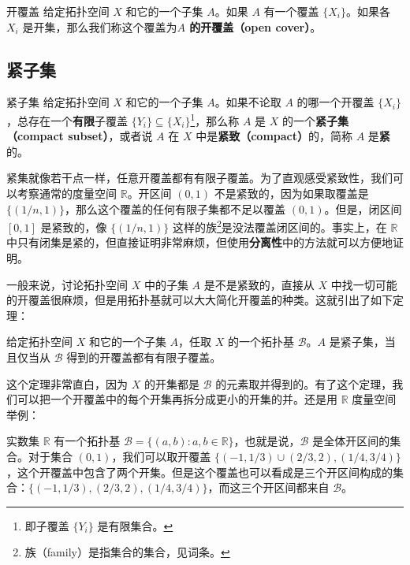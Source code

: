 \begin{definition}{开覆盖}
给定拓扑空间 $X$ 和它的一个子集 $A$。如果 $A$ 有一个覆盖 $\{X_i\}$。如果各 $X_i$ 是开集，那么我们称这个覆盖为\textbf{$A$ 的开覆盖（open cover）}。
\end{definition}

\subsection{紧子集}


\begin{definition}{紧子集}\label{Topo2_def1}
给定拓扑空间 $X$ 和它的一个子集 $A$。如果不论取 $A$ 的哪一个开覆盖 $\{X_i\}$，总存在一个\textbf{有限}子覆盖 $\{Y_i\}\subseteq \{X_i\}$\footnote{即子覆盖 $\{Y_i\}$ 是有限集合。}，那么称 $A$ 是 $X$ 的一个\textbf{紧子集（compact subset）}，或者说 $A$ 在 $X$ 中是\textbf{紧致（compact）}的，简称 $A$ 是\textbf{紧}的。
\end{definition}

紧集就像若干点一样，任意开覆盖都有有限子覆盖。为了直观感受紧致性，我们可以考察通常的度量空间 $\mathbb{R}$。开区间 $(0,1)$ 不是紧致的，因为如果取覆盖是 $\{(1/n, 1)\}$，那么这个覆盖的任何有限子集都不足以覆盖 $(0, 1)$。但是，闭区间 $[0,1]$ 是紧致的，像 $\{(1/n, 1)\}$ 这样的族\footnote{族（family）是指集合的集合，见词条。}是没法覆盖闭区间的。事实上，在 $\mathbb{R}$ 中只有闭集是紧的，但直接证明非常麻烦，但使用\textbf{分离性}中的方法就可以方便地证明。

一般来说，讨论拓扑空间 $X$ 中的子集 $A$ 是不是紧致的，直接从 $X$ 中找一切可能的开覆盖很麻烦，但是用拓扑基就可以大大简化开覆盖的种类。这就引出了如下定理：

\begin{theorem}{}\label{Topo2_the1}
给定拓扑空间 $X$ 和它的一个子集 $A$，任取 $X$ 的一个拓扑基 $\mathcal{B}$。$A$ 是紧子集，当且仅当从 $\mathcal{B}$ 得到的开覆盖都有有限子覆盖。
\end{theorem}

这个定理非常直白，因为 $X$ 的开集都是 $\mathcal{B}$ 的元素取并得到的。有了这个定理，我们可以把一个开覆盖中的每个开集再拆分成更小的开集的并。还是用 $\mathbb{R}$ 度量空间举例：

\begin{example}{}\label{Topo2_ex1}
实数集 $\mathbb{R}$ 有一个拓扑基 $\mathcal{B}=\{(a,b):a,b\in \mathbb{R}\}$，也就是说，$\mathcal{B}$ 是全体开区间的集合。对于集合 $(0,1)$，我们可以取开覆盖 $\{(-1,1/3)\cup(2/3,2), (1/4, 3/4)\}$，这个开覆盖中包含了两个开集。但是这个覆盖也可以看成是三个开区间构成的集合：$\{(-1,1/3), (2/3,2), (1/4, 3/4)\}$，而这三个开区间都来自 $\mathcal{B}$。

\end{example}

